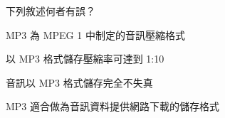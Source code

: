 \ifx\ntpcNinetyTwo\undefined[92學年基北區] \fi
下列敘述何者有誤？
  \begin{optionlist}
  \item MP3 為 MPEG 1 中制定的音訊壓縮格式
  \item 以 MP3 格式儲存壓縮率可達到 1:10
  \item 音訊以 MP3 格式儲存完全不失真\label{ntpc-92-a36}
  \item MP3 適合做為音訊資料提供網路下載的儲存格式
  \end{optionlist}
